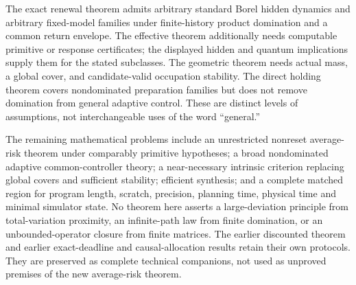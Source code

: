 The exact renewal theorem admits arbitrary standard Borel hidden dynamics and arbitrary fixed-model families under finite-history product domination and a common return envelope. The effective theorem additionally needs computable primitive or response certificates; the displayed hidden and quantum implications supply them for the stated subclasses. The geometric theorem needs actual mass, a global cover, and candidate-valid occupation stability. The direct holding theorem covers nondominated preparation families but does not remove domination from general adaptive control. These are distinct levels of assumptions, not interchangeable uses of the word ``general.''

The remaining mathematical problems include an unrestricted nonreset average-risk theorem under comparably primitive hypotheses; a broad nondominated adaptive common-controller theory; a near-necessary intrinsic criterion replacing global covers and sufficient stability; efficient synthesis; and a complete matched region for program length, scratch, precision, planning time, physical time and minimal simulator state. No theorem here asserts a large-deviation principle from total-variation proximity, an infinite-path law from finite domination, or an unbounded-operator closure from finite matrices. The earlier discounted theorem \cite{Discounted} and earlier exact-deadline and causal-allocation results retain their own protocols. They are preserved as complete technical companions, not used as unproved premises of the new average-risk theorem.
